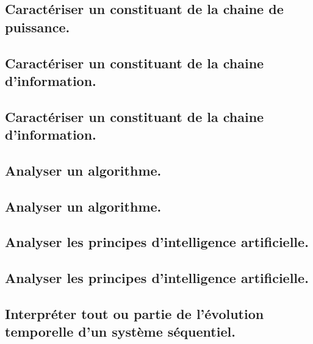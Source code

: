 \documentclass[10pt,fleqn]{book}
\newcommand{\repRel}{../..}
\newcommand{\repStyle}{\repRel/Style}
\newcommand{\td}{fichier_td}
\newcommand{\repExos}{\repRel/ExercicesCompetences}
\newcommand{\repExo}{dossier}
\begin{document}
\subsection{Caractériser un constituant de la chaine de puissance.} 

\subsection{Caractériser un constituant de la chaine d’information.} 

\subsection{Caractériser un constituant de la chaine d’information.} 

\renewcommand{\repExo}{\repExos/A3_AnalyseFonctionnelleStructurelle/A3_06_ChaineInfo/507_Divers}
\renewcommand{\td}{507_Divers}
\graphicspath{{\repStyle/png/}{\repExo/images/}}


\renewcommand{\repExo}{\repExos/A3_AnalyseFonctionnelleStructurelle/A3_06_ChaineInfo/50_BancBalafre}
\renewcommand{\td}{50_BancBalafre}
\graphicspath{{\repStyle/png/}{\repExo/images/}}


\renewcommand{\repExo}{\repExos/A3_AnalyseFonctionnelleStructurelle/A3_06_ChaineInfo/538_Codeur}
\renewcommand{\td}{538_Codeur}
\graphicspath{{\repStyle/png/}{\repExo/images/}}


\subsection{Analyser un algorithme. } 

\subsection{Analyser un algorithme. } 

\subsection{Analyser les principes d'intelligence artificielle. } 

\subsection{Analyser les principes d'intelligence artificielle. } 

\subsection{Interpréter tout ou partie de l’évolution temporelle d’un système séquentiel.} 
\end{document}
